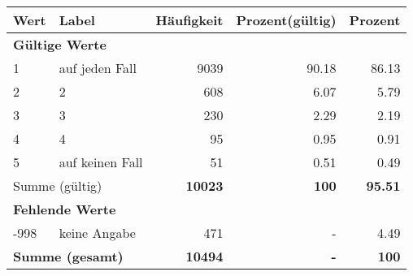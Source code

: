      \begin{longtable}{lXrrr}
     \toprule
     \textbf{Wert} & \textbf{Label} & \textbf{Häufigkeit} & \textbf{Prozent(gültig)} & \textbf{Prozent} \\
     \endhead
     \midrule
     \multicolumn{5}{l}{\textbf{Gültige Werte}}\\

     1 &
     \multicolumn{1}{X}{ auf jeden Fall   } &


       \num{9039} &
       \num[round-mode=places,round-precision=2]{90,18} &
         \num[round-mode=places,round-precision=2]{86,13} \\

     2 &
     \multicolumn{1}{X}{ 2   } &


       \num{608} &
       \num[round-mode=places,round-precision=2]{6,07} &
         \num[round-mode=places,round-precision=2]{5,79} \\

     3 &
     \multicolumn{1}{X}{ 3   } &


       \num{230} &
       \num[round-mode=places,round-precision=2]{2,29} &
         \num[round-mode=places,round-precision=2]{2,19} \\

     4 &
     \multicolumn{1}{X}{ 4   } &


       \num{95} &
       \num[round-mode=places,round-precision=2]{0,95} &
         \num[round-mode=places,round-precision=2]{0,91} \\

     5 &
     \multicolumn{1}{X}{ auf keinen Fall   } &


       \num{51} &
       \num[round-mode=places,round-precision=2]{0,51} &
         \num[round-mode=places,round-precision=2]{0,49} \\
     \midrule
     \multicolumn{2}{l}{Summe (gültig)} &
       \textbf{\num{10023}} &
     \textbf{100} &
       \textbf{\num[round-mode=places,round-precision=2]{95,51}} \\
     \multicolumn{5}{l}{\textbf{Fehlende Werte}}\\
       -998 &
       keine Angabe &
         \num{471} &
        - &
         \num[round-mode=places,round-precision=2]{4,49} \\
     \midrule
     \multicolumn{2}{l}{\textbf{Summe (gesamt)}} &
          \textbf{\num{10494}} &
        \textbf{-} &
        \textbf{100} \\
     \bottomrule
     \end{longtable}
     
